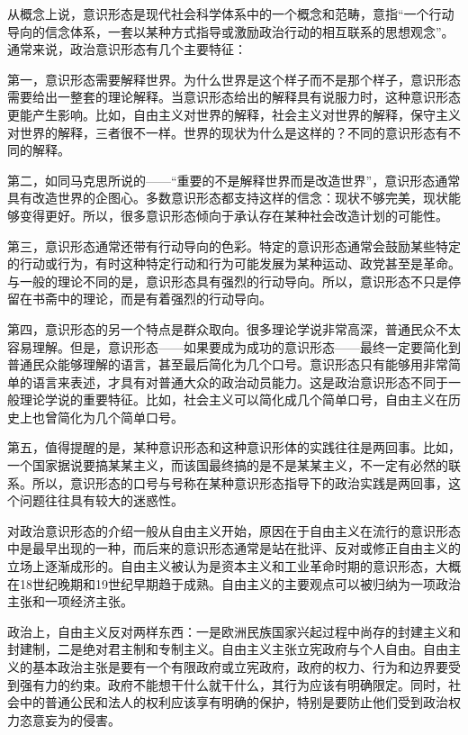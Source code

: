 从概念上说，意识形态是现代社会科学体系中的一个概念和范畴，意指“一个行动导向的信念体系，一套以某种方式指导或激励政治行动的相互联系的思想观念”。通常来说，政治意识形态有几个主要特征：

第一，意识形态需要解释世界。为什么世界是这个样子而不是那个样子，意识形态需要给出一整套的理论解释。当意识形态给出的解释具有说服力时，这种意识形态更能产生影响。比如，自由主义对世界的解释，社会主义对世界的解释，保守主义对世界的解释，三者很不一样。世界的现状为什么是这样的？不同的意识形态有不同的解释。

第二，如同马克思所说的——“重要的不是解释世界而是改造世界”，意识形态通常具有改造世界的企图心。多数意识形态都支持这样的信念：现状不够完美，现状能够变得更好。所以，很多意识形态倾向于承认存在某种社会改造计划的可能性。

第三，意识形态通常还带有行动导向的色彩。特定的意识形态通常会鼓励某些特定的行动或行为，有时这种特定行动和行为可能发展为某种运动、政党甚至是革命。与一般的理论不同的是，意识形态具有强烈的行动导向。所以，意识形态不只是停留在书斋中的理论，而是有着强烈的行动导向。

第四，意识形态的另一个特点是群众取向。很多理论学说非常高深，普通民众不太容易理解。但是，意识形态——如果要成为成功的意识形态——最终一定要简化到普通民众能够理解的语言，甚至最后简化为几个口号。意识形态只有能够用非常简单的语言来表述，才具有对普通大众的政治动员能力。这是政治意识形态不同于一般理论学说的重要特征。比如，社会主义可以简化成几个简单口号，自由主义在历史上也曾简化为几个简单口号。

第五，值得提醒的是，某种意识形态和这种意识形体的实践往往是两回事。比如，一个国家据说要搞某某主义，而该国最终搞的是不是某某主义，不一定有必然的联系。所以，意识形态的口号与号称在某种意识形态指导下的政治实践是两回事，这个问题往往具有较大的迷惑性。


对政治意识形态的介绍一般从自由主义开始，原因在于自由主义在流行的意识形态中是最早出现的一种，而后来的意识形态通常是站在批评、反对或修正自由主义的立场上逐渐成形的。自由主义被认为是资本主义和工业革命时期的意识形态，大概在18世纪晚期和19世纪早期趋于成熟。自由主义的主要观点可以被归纳为一项政治主张和一项经济主张。

政治上，自由主义反对两样东西：一是欧洲民族国家兴起过程中尚存的封建主义和封建制，二是绝对君主制和专制主义。自由主义主张立宪政府与个人自由。自由主义的基本政治主张是要有一个有限政府或立宪政府，政府的权力、行为和边界要受到强有力的约束。政府不能想干什么就干什么，其行为应该有明确限定。同时，社会中的普通公民和法人的权利应该享有明确的保护，特别是要防止他们受到政治权力恣意妄为的侵害。

